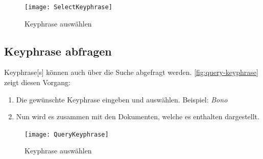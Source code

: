\begin{figure}[ht]
\centering
\texttt{[image: SelectKeyphrase]}
\caption{Keyphrase auswählen}
\label{fig:select-keyphrase}
\end{figure}

\subsection{Keyphrase abfragen}
\gls{Keyphrase}[s] können auch über die Suche abgefragt werden. \autoref{fig:query-keyphrase} zeigt diesen Vorgang:
\begin{enumerate}
    \item Die gewünschte \gls{Keyphrase} eingeben und auswählen. Beispiel: \textit{Bono}
    \item Nun wird es zusammen mit den Dokumenten, welche es enthalten dargestellt.
\end{enumerate}

\begin{figure}[ht]
\centering
\texttt{[image: QueryKeyphrase]}
\caption{Keyphrase auswählen}
\label{fig:query-keyphrase}
\end{figure}


